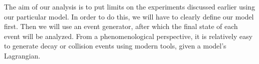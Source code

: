 \label{chapter:analysis}

The aim of our analysis is to put limits on the experiments discussed earlier using our particular model.
In order to do this, we will have to clearly define our model first.
Then we will use an event generator, after which the final state of each event will be analyzed.
From a phenomenological perspective, it is relatively easy to generate decay or collision events using modern tools, given a model's Lagrangian. 




